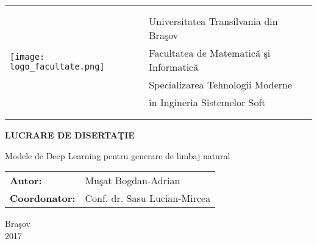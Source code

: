 \begin{titlepage}
	\begin{center}
		\vspace*{-2cm}

		\Large
		\begin{tabular}{ll}
			\multirow{8}{*}{\texttt{[image: logo\_facultate.png]}}
			&\\
			&\\
			&Universitatea Transilvania din Bra\c sov\\
			&Facultatea de Matematic\u a \c si Informatic\u a\\
			&Specializarea Tehnologii Moderne \\
			& \^ in Ingineria Sistemelor Soft\\
			&\\
			&\\
		\end{tabular}

		\vspace{1.5cm}
					
		\Huge
		\textbf{LUCRARE DE DISERTA\c TIE}
		
		\vspace{1cm}
		
		\LARGE
		Modele de Deep Learning pentru generare de limbaj natural
		
		\vspace{5cm}
				
		\Large
		\begin{tabular}{ll}
			\textbf{Autor:}&Mu\c sat Bogdan-Adrian\\
			\textbf{Coordonator:}&Conf. dr. Sasu Lucian-Mircea
		\end{tabular}
		
		\vfill
		
		\Large
		Bra\c sov\\
		2017
        
	\end{center}
\end{titlepage}